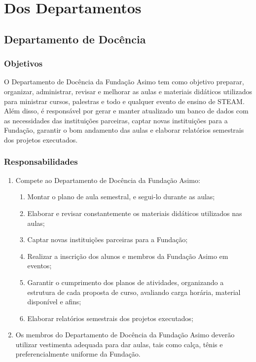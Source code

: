 \chapter{Dos Departamentos}
    \section{Departamento de Docência}
        \subsection{Objetivos}
            O Departamento de Docência da Fundação Asimo tem como objetivo preparar, organizar, administrar, revisar e melhorar as aulas e materiais didáticos utilizados para ministrar cursos, palestras e todo e qualquer evento de ensino de STEAM. Além disso, é responsável por gerar e manter atualizado um banco de dados com as necessidades das instituições parceiras, captar novas instituições para a Fundação, garantir o bom andamento das aulas e elaborar relatórios semestrais dos projetos executados.
            
        \subsection{Responsabilidades}
            \begin{enumerate}
                \item Compete ao Departamento de Docência da Fundação Asimo:
                \begin{enumerate}
                    \item Montar o plano de aula semestral, e segui-lo durante as aulas; 
                    \item Elaborar e revisar constantemente os materiais didáticos utilizados nas aulas;
                    \item Captar novas instituições parceiras para a Fundação;
                    \item Realizar a inscrição dos alunos e membros da Fundação Asimo em eventos;
                    \item Garantir o cumprimento dos planos de atividades, organizando a estrutura de cada proposta de curso, avaliando carga horária, material disponível e afins;
                    \item Elaborar relatórios semestrais dos projetos executados;
                \end{enumerate}
                \item Os membros do Departamento de Docência da Fundação Asimo deverão utilizar vestimenta adequada para dar aulas, tais como calça, tênis e preferencialmente uniforme da Fundação.
            \end{enumerate}
            
